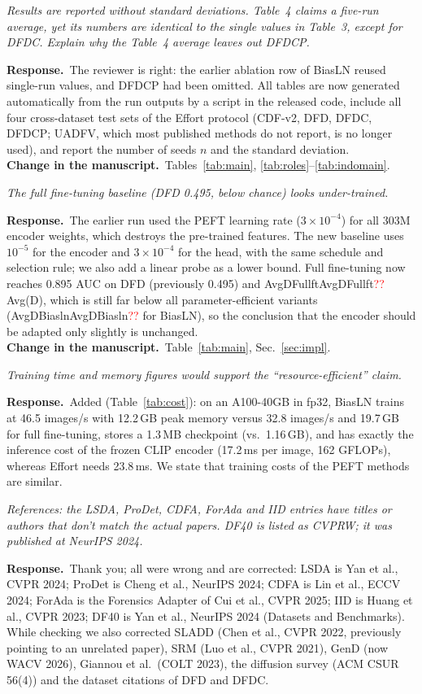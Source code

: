 \documentclass[11pt]{article}
\newcommand{\num}[1]{\ifcsname #1\endcsname\csname #1\endcsname\else\textcolor{red}{??}\fi}
\newenvironment{comment}{\par\medskip\noindent\begin{minipage}{\linewidth}\color{black!70}\itshape}{\end{minipage}\par\smallskip}
\newcommand{\resp}{\noindent\textbf{Response.}~}
\newcommand{\change}{\noindent\textbf{Change in the manuscript.}~}
\begin{document}
\begin{comment}
Results are reported without standard deviations. Table~4 claims a five-run average, yet its numbers are identical to the single values in Table~3, except for DFDC. Explain why the Table~4 average leaves out DFDCP.
\end{comment}
\resp The reviewer is right: the earlier ablation row of BiasLN reused single-run values, and DFDCP had been omitted. All tables are now generated automatically from the run outputs by a script in the released code, include all four cross-dataset test sets of the Effort protocol (CDF-v2, DFD, DFDC, DFDCP; UADFV, which most published methods do not report, is no longer used), and report the number of seeds $n$ and the standard deviation.\\
\change Tables~\ref{tab:main}, \ref{tab:roles}--\ref{tab:indomain}.

\begin{comment}
The full fine-tuning baseline (DFD 0.495, below chance) looks under-trained.
\end{comment}
\resp The earlier run used the PEFT learning rate ($3\times10^{-4}$) for all 303M encoder weights, which destroys the pre-trained features. The new baseline uses $10^{-5}$ for the encoder and $3\times10^{-4}$ for the head, with the same schedule and selection rule; we also add a linear probe as a lower bound. Full fine-tuning now reaches 0.895 AUC on DFD (previously 0.495) and \num{AvgDFullft} Avg(D), which is still far below all parameter-efficient variants (\num{AvgDBiasln} for BiasLN), so the conclusion that the encoder should be adapted only slightly is unchanged.\\
\change Table~\ref{tab:main}, Sec.~\ref{sec:impl}.

\begin{comment}
Training time and memory figures would support the ``resource-efficient'' claim.
\end{comment}
\resp Added (Table~\ref{tab:cost}): on an A100-40GB in fp32, BiasLN trains at 46.5 images/s with 12.2\,GB peak memory versus 32.8 images/s and 19.7\,GB for full fine-tuning, stores a 1.3\,MB checkpoint (vs.\ 1.16\,GB), and has exactly the inference cost of the frozen CLIP encoder (17.2\,ms per image, 162 GFLOPs), whereas Effort needs 23.8\,ms. We state that training costs of the PEFT methods are similar.

\begin{comment}
References: the LSDA, ProDet, CDFA, ForAda and IID entries have titles or authors that don't match the actual papers. DF40 is listed as CVPRW; it was published at NeurIPS 2024.
\end{comment}
\resp Thank you; all were wrong and are corrected: LSDA is Yan et al., CVPR 2024; ProDet is Cheng et al., NeurIPS 2024; CDFA is Lin et al., ECCV 2024; ForAda is the Forensics Adapter of Cui et al., CVPR 2025; IID is Huang et al., CVPR 2023; DF40 is Yan et al., NeurIPS 2024 (Datasets and Benchmarks). While checking we also corrected SLADD (Chen et al., CVPR 2022, previously pointing to an unrelated paper), SRM (Luo et al., CVPR 2021), GenD (now WACV 2026), Giannou et al.\ (COLT 2023), the diffusion survey (ACM CSUR 56(4)) and the dataset citations of DFD and DFDC.
\end{document}
